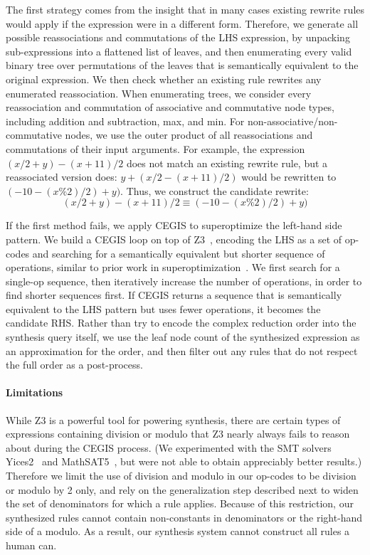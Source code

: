 \documentclass[acmsmall,review,anonymous]{acmart}\settopmatter{printfolios=true,printccs=false,printacmref=false}
\begin{document}
The first strategy comes from the insight that in many cases existing rewrite rules would apply
if the expression were in a different form.  Therefore, we generate all possible
reassociations and commutations of the LHS expression, by unpacking sub-expressions
into a flattened list of leaves, and then enumerating every valid binary
tree over permutations of the leaves that is semantically equivalent to the original
expression.  We then check whether an existing rule rewrites any enumerated reassociation.
When enumerating trees, we consider every reassociation and commutation
of associative and commutative node types, including addition and subtraction, max, and
min.  For non-associative/non-commutative nodes, we use the outer product of all reassociations
and commutations of their input arguments.  For example, the expression $(x/2 + y) - (x + 11)/2$
does not match an existing rewrite rule, but a reassociated version does: $y + (x/2 - (x + 11)/2)$
would be rewritten to $(-10 - (x \% 2)/2) + y)$.  Thus, we construct the candidate rewrite:
$$(x/2 + y) - (x + 11)/2 \equiv (-10 - (x \% 2)/2) + y)$$

If the first method fails, we apply CEGIS to superoptimize the left-hand side pattern.
We build a CEGIS loop on top of Z3~\cite{de2008z3}, encoding the LHS as a set of op-codes
and searching for a semantically equivalent but shorter sequence of operations, similar
to prior work in superoptimization~\cite{regehr2018superoptimization, mangpo2016superoptimization}.
We first search for a single-op sequence,
then iteratively increase the number of operations, in order to find shorter sequences
first.  If CEGIS returns a sequence that is semantically equivalent to the LHS pattern but uses fewer
operations, it becomes the candidate RHS. Rather than try to encode the complex reduction order into the synthesis query itself, we use the leaf node count of the synthesized expression as an approximation for the order, and then filter out any rules that do not respect the full order as a post-process. 

\paragraph{Limitations} While Z3 is a powerful tool for powering synthesis, there are certain types of expressions 
containing division or modulo that Z3 nearly always fails to reason about during the CEGIS process. (We experimented with the SMT solvers Yices2~\cite{jovanovic2017solving} and MathSAT5~\cite{mathsat5}, but were not able to obtain appreciably better results.)
Therefore we limit the use of division and modulo in our op-codes to be division
or modulo by 2 only, and rely on the generalization step described next to
widen the set of denominators for which a rule applies.  Because of this
restriction, our synthesized rules cannot contain non-constants in denominators
or the right-hand side of a modulo.  As a result, our synthesis system cannot
construct all rules a human can.
\end{document}
